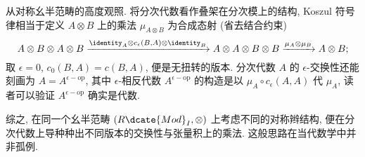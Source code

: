 从对称幺半范畴的高度观照. 将分次代数看作叠架在分次模上的结构, Koszul 符号律相当于定义 $A \otimes B$ 上的乘法 $\mu_{A \otimes B}$ 为合成态射 (省去结合约束)
\[ A \otimes B \otimes A \otimes B \xrightarrow{\identity_A \otimes c_\epsilon(B, A) \otimes \identity_B} A \otimes A \otimes B \otimes B \xrightarrow{\mu_A \otimes \mu_B} A \otimes B; \]
取 $\epsilon=0$, $c_0(B,A) = c(B, A)$, 便是无扭转的版本. 分次代数 $A$ 的 $\epsilon$-交换性还能刻画为 $A = A^{\epsilon-\text{op}}$, 其中 $\epsilon$-相反代数 $A^{\epsilon-\text{op}}$ 的构造是以 $\mu_A \circ c_\epsilon(A,A)$ 代 $\mu_A$, 读者可以验证 $A^{\epsilon-\text{op}}$ 确实是代数.

综之, 在同一个幺半范畴 $(R\dcate{Mod}_I, \otimes)$ 上考虑不同的对称辫结构, 便在分次代数上导种种出不同版本的交换性与张量积上的乘法. 这般思路在当代数学中并非孤例.

